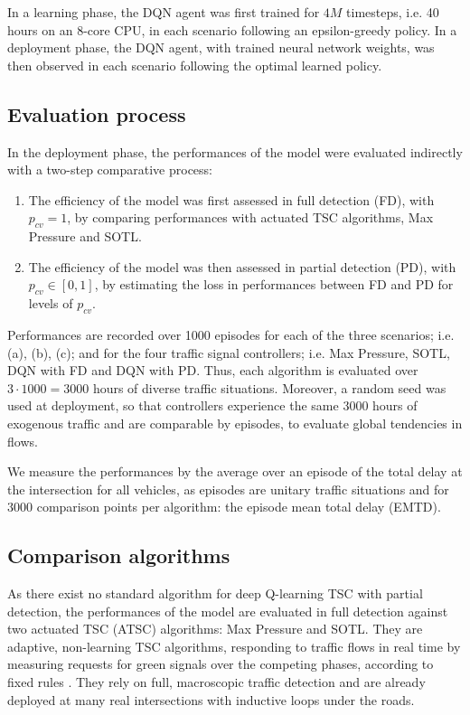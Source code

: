 \documentclass[journal]{IEEEtran}
\begin{document}
In a learning phase, the DQN agent was first trained for $4M$ timesteps, i.e. 40 hours on an 8-core CPU, in each scenario following an epsilon-greedy policy. In a deployment phase, the DQN agent, with trained neural network weights, was then observed in each scenario following the optimal learned policy.

\subsection{Evaluation process}

In the deployment phase, the performances of the model were evaluated indirectly with a two-step comparative process:
\begin{enumerate}
  \item The efficiency of the model was first assessed in full detection (FD), with $p_{cv} = 1$, by comparing performances with actuated TSC algorithms, Max Pressure and SOTL.
  \item The efficiency of the model was then assessed in partial detection (PD), with $p_{cv} \in [0,1]$, by estimating the loss in performances between FD and PD for levels of $p_{cv}$.
\end{enumerate}

Performances are recorded over 1000 episodes for each of the three scenarios; i.e. (a), (b), (c); and for the four traffic signal controllers; i.e. Max Pressure, SOTL, DQN with FD and DQN with PD. Thus, each algorithm is evaluated over $3 \cdot 1000 = 3000$ hours of diverse traffic situations. Moreover, a random seed was used at deployment, so that controllers experience the same $3000$ hours of exogenous traffic and are comparable by episodes, to evaluate global tendencies in flows.

We measure the performances by the average over an episode of the total delay at the intersection for all vehicles, as episodes are unitary traffic situations and for $3000$ comparison points per algorithm: the episode mean total delay (EMTD).

\subsection{Comparison algorithms}

As there exist no standard algorithm for deep Q-learning TSC with partial detection, the performances of the model are evaluated in full detection against two actuated TSC (ATSC) algorithms: Max Pressure and SOTL. They are adaptive, non-learning TSC algorithms, responding to traffic flows in real time by measuring requests for green signals over the competing phases, according to fixed rules \cite{wei2020survey}. They rely on full, macroscopic traffic detection and are already deployed at many real intersections with inductive loops under the roads.
\\
\end{document}
